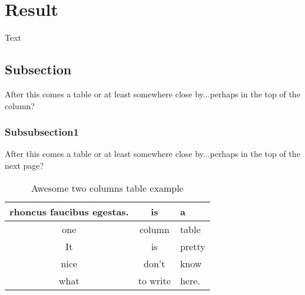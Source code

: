 \section{Result}\label{sec:result}
Text

\subsection{Subsection}
After this comes a table or at least somewhere close by...perhaps in the top
of the column?

\subsubsection{Subsubsection1}
After this comes a table or at least somewhere close by...perhaps in the top
of the next page?
\begin{table*}
\centering
    \caption{Awesome two columns table example}
    \begin{tabular}{|c|c|l|} \hline
    \label{table:two_columns}
        rhoncus faucibus egestas. & is & a \\ \hline
        one & column & table\\ \hline
        It & is & pretty \\ \hline
        nice & don't & know \\ \hline
        what & to write & here.\\
        \hline
    \end{tabular}
\end{table*}
